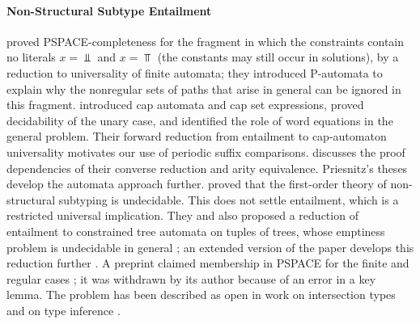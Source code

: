 \paragraph{Non-Structural Subtype Entailment}
\citet{NiehrenPriesnitz99} proved PSPACE-completeness for the fragment in which the
constraints contain no literals $x = \Bot$ and $x = \Top$ (the constants may still occur in
solutions), by a reduction to universality of finite automata; they introduced P-automata to
explain why the nonregular sets of paths that arise in general can be ignored in this
fragment. \citet{NiehrenPriesnitz01,NiehrenPriesnitz03} introduced cap
automata and cap set expressions, proved decidability of the unary case,
and identified the role of word equations in the general problem. Their
forward reduction from entailment to cap-automaton universality motivates
our use of periodic suffix comparisons.  discusses the
proof dependencies of their converse reduction and arity equivalence.
Priesnitz's theses \citep{Priesnitz00,Priesnitz04} develop the automata
approach further.
\citet{SuAikenNiehrenPriesnitzTreinen02} proved that the first-order theory
of non-structural subtyping is undecidable. This does not settle entailment,
which is a restricted universal implication. They and \citet{Su02} also
proposed a reduction of entailment to constrained tree automata on tuples of
trees, whose emptiness problem is undecidable in general \citep{Treinen00};
an extended version of the paper develops this reduction further
\citep{SuEtAl06}. A preprint
claimed membership in PSPACE for the finite and regular cases \citep{Schubert21}; it was
withdrawn by its author because of an error in a key lemma. The
problem has been described as open in work on intersection types and on type inference
\citep{DudenhefnerMartensRehof17,JiangCuiOliveira25}.


